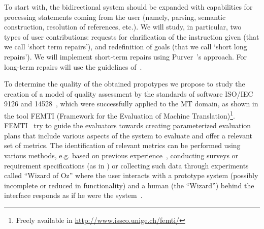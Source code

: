 To start with, the bidirectional system should be expanded with capabilities
for  processing statements coming from the user (namely, parsing, semantic
construction, resolution of references, etc.). We will study, in particular, two
types of user contributions: requests for clarification of the instruction
given (that we call `short term repairs'), and redefinition of goals (that we
call `short long repairs'). We will implement short-term repairs
using Purver~'s approach. For long-term repairs will use the
guidelines of~\cite{blaylock05a}. 
\medskip


\noindent
To determine the quality of the obtained propotypes we propose to study the
creation of a model of quality assessment by the standards of software ISO/IEC
9126 and 14528~\cite{ISO9126-1,ISO14598-1}, which were successfully applied to
the MT domain, as shown in the tool FEMTI (Framework for the Evaluation of
Machine Translation)\footnote{Freely available in
\url{http://www.issco.unige.ch/femti/}}. FEMTI~\cite{Est2005}
try to guide the evaluators towards creating parameterized evaluation
plans that include various aspects of the system to evaluate and offer a
relevant set of metrics. The identification of relevant metrics can be performed
using various methods, e.g. based on previous
experience~\cite{paradise06,Chu2000,Litman2002}, conducting
surveys or requirement specifications (as in \cite{Lecoeuche98}) or
collecting such data through experiments called ``Wizard of Oz'' where the user
interacts with a prototype system (possibly incomplete or reduced in
functionality) and a human (the ``Wizard'') behind the interface responds as if
he were the system~\cite{Dahlback93,Fabbrizio05}.

